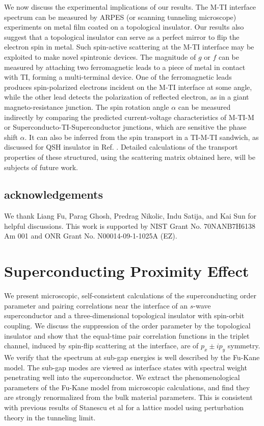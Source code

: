 \documentclass[11pt]{report}
\begin{document}
We now discuss the experimental implications of our results. The M-TI interface spectrum can be measured by 
ARPES (or scanning tunneling microscope) experiments on metal film coated on a topological insulator.
Our results also suggest that a topological insulator can serve as a perfect mirror to flip the 
electron spin in metal. Such spin-active scattering at the M-TI interface may be 
exploited to make novel spintronic devices. The magnitude of $g$ or $f$
can be measured by attaching two ferromagnetic leads to a piece of metal in contact with TI, 
forming a multi-terminal device. 
One of the ferromagnetic leads produces spin-polarized electrons incident on the M-TI interface at some angle, while 
the other lead detects the polarization of reflected electron, as in a
giant magneto-resistance junction. The spin rotation angle $\alpha$ can be measured 
indirectly by comparing the predicted current-voltage characteristics of M-TI-M 
or Superconducto-TI-Superconductor junctions, which are sensitive the phase shift $\alpha$. It can also be inferred from 
the spin transport in a TI-M-TI sandwich, as discussed for QSH insulator in Ref. \cite{yokoyama09}.
Detailed calculations of the transport properties of these structured,
using the scattering matrix obtained here, will be subjects of future work.

\section{acknowledgements}
We thank Liang Fu, Parag Ghosh, Predrag Nikolic, Indu Satija, and Kai Sun 
for helpful discussions. This work is supported by NIST Grant No. 70NANB7H6138 Am 001 
and ONR Grant No. N00014-09-1-1025A (EZ). 


\chapter{Superconducting Proximity Effect}

We present microscopic, self-consistent calculations of the 
superconducting order parameter and pairing correlations near the 
interface of an $s$-wave superconductor and
a three-dimensional topological insulator with spin-orbit coupling.
%
We discuss the suppression of the order parameter by the topological 
insulator and show that the equal-time pair correlation functions
in the triplet channel, induced by spin-flip scattering at the interface, 
are of $p_x\pm i p_y$ symmetry.
%
We verify that the spectrum at sub-gap energies is well described by
the Fu-Kane model. The sub-gap modes are viewed as interface states with
spectral weight penetrating well into the superconductor. 
We extract the phenomenological 
parameters of the Fu-Kane model from microscopic calculations, and find they
are strongly renormalized from the bulk material parameters. This is consistent 
with previous results of Stanescu et al for a lattice model using perturbation
theory in the tunneling limit.
\end{document}

